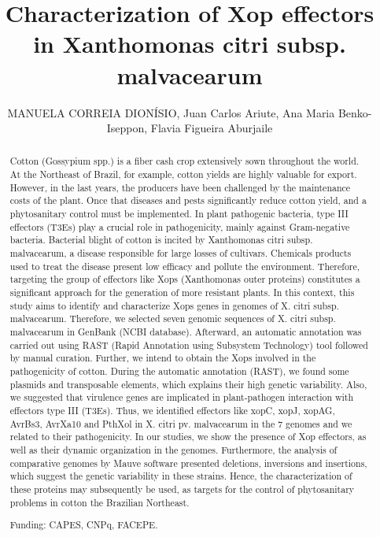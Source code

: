 \documentclass[twoside]{article}
\title{\vspace{-15mm}\fontsize{24pt}{10pt}\selectfont\textbf{ Characterization of Xop effectors in Xanthomonas citri subsp. malvacearum }} %
\author{ MANUELA  CORREIA  DION\'ISIO, Juan Carlos Ariute, Ana Maria Benko-Iseppon, Flavia Figueira Aburjaile }
\affil{ UFPE }
\date{}
\begin{document}
  
  
  \maketitle %
  
  
  \thispagestyle{fancy} %
  
  
  \begin{abstract}
  Cotton (Gossypium spp.) is a fiber cash crop extensively sown throughout the world. At the Northeast of Brazil,  for example,  cotton yields are highly valuable for export. However,  in the last years,  the producers have been challenged by the maintenance costs of the plant. Once that diseases and pests significantly reduce cotton yield,  and a phytosanitary control must be implemented. In plant pathogenic bacteria,  type III effectors (T3Es) play a crucial role in pathogenicity,  mainly against Gram-negative bacteria. Bacterial blight of cotton is incited by Xanthomonas citri subsp. malvacearum,  a disease responsible for large losses of cultivars. Chemicals products used to treat the disease present low efficacy and pollute the environment. Therefore,  targeting the group of effectors like Xops (Xanthomonas outer proteins) constitutes a significant approach for the generation of more resistant plants. In this context,  this study aims to identify and characterize Xops genes in genomes of X. citri subsp. malvacearum. Therefore,  we selected seven genomic sequences of X. citri subsp. malvacearum in GenBank (NCBI database). Afterward,  an automatic annotation was carried out using RAST (Rapid Annotation using Subsystem Technology) tool followed by manual curation. Further,  we intend to obtain the Xops involved in the pathogenicity of cotton. During the automatic annotation (RAST),  we found some plasmids and transposable elements,  which explains their high genetic variability. Also,  we suggested that virulence genes are implicated in plant-pathogen interaction with effectors type III (T3Es). Thus,  we identified effectors like xopC,  xopJ,  xopAG,  AvrBs3,  AvrXa10 and PthXol in X. citri pv. malvacearum in the 7 genomes and we related to their pathogenicity. In our studies,  we show the presence of Xop effectors,  as well as their dynamic organization in the genomes. Furthermore,  the analysis of comparative genomes by Mauve software presented deletions,  inversions and insertions,  which suggest the genetic variability in these strains. Hence,  the characterization of these proteins may subsequently be used,  as targets for the control of phytosanitary problems in cotton the Brazilian Northeast.
  
  Funding: CAPES,  CNPq,  FACEPE. \\ 
  \end{abstract}
  
\end{document}
